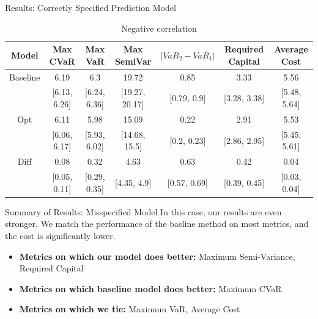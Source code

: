 \documentclass{beamer}
\begin{document}
\begin{frame}{Results: Correctly Specified Prediction Model}
\fontsize{6.5pt}{8pt}\selectfont
\begin{table}
    \centering 
    \begin{tabular}{ccccccc}
        \toprule
           Model &     Max CVaR &      Max VaR &    Max SemiVar & $|VaR_2 - VaR_1|$ & Required Capital & Average Cost \\
        \midrule
        Baseline &         6.19 &          6.3 &          19.72 &              0.85 &             3.33 &         5.56 \\
                 & [6.13, 6.26] & [6.24, 6.36] & [19.27, 20.17] &       [0.79, 0.9] &     [3.28, 3.38] & [5.48, 5.64] \\
             Opt &         6.11 &         5.98 &          15.09 &              0.22 &             2.91 &         5.53 \\
                 & [6.06, 6.17] & [5.93, 6.02] &  [14.68, 15.5] &       [0.2, 0.23] &     [2.86, 2.95] & [5.45, 5.61] \\
            Diff &         0.08 &         0.32 &           4.63 &              0.63 &             0.42 &         0.04 \\
                 & [0.05, 0.11] & [0.29, 0.35] &    [4.35, 4.9] &      [0.57, 0.69] &     [0.39, 0.45] & [0.03, 0.04] \\
        \bottomrule
        \end{tabular}
        \caption{Negative correlation}
\end{table}
\end{frame}

\begin{frame}{Summary of Results: Misspecified Model}
    In this case, our results are even stronger. We match the performance of the basline method on most metrics, and the cost is significantly lower. 
    \begin{itemize}
        \setlength\itemsep{1em}
        \item \textbf{Metrics on which our model does better:} Maximum Semi-Variance, Required Capital 
        \item \textbf{Metrics on which baseline model does better:} Maximum CVaR 
        \item \textbf{Metrics on which we tie:} Maximum VaR, Average Cost
    \end{itemize} 
    \end{frame}
\end{document}
